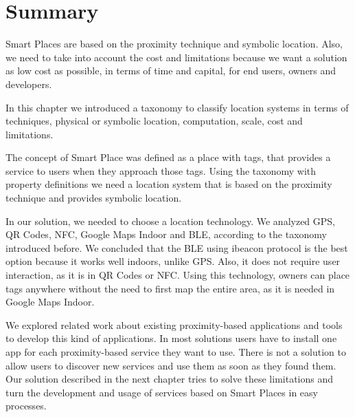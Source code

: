 \section{Summary}
\label{sec:background_summary}

Smart Places are based on the proximity technique and symbolic location.
Also, we need to take into account the cost and limitations because we want a solution as low cost as possible, in terms of time and capital, for end users, owners and developers.

In this chapter we introduced a taxonomy to classify location systems in terms of techniques, physical or symbolic location, computation, scale, cost and limitations.

The concept of Smart Place was defined as a place with tags, that provides a service to users when they approach those tags.
Using the taxonomy with property definitions we need a location system that is based on the proximity technique and provides symbolic location.

In our solution, we needed to choose a location technology.
We analyzed \gls{GPS}, \gls{QR} Codes, \gls{NFC}, Google Maps Indoor and \gls{BLE}, according to the taxonomy introduced before.
We concluded that the \gls{BLE} using ibeacon protocol is the best option because it works well indoors, unlike \gls{GPS}.
Also, it does not require user interaction, as it is in \gls{QR} Codes or \gls{NFC}.
Using this technology, owners can place tags anywhere without the need to first map the entire area, as it is needed in Google Maps Indoor.

We explored related work about existing proximity-based applications and tools to develop this kind of applications.
In most solutions users have to install one app for each proximity-based service they want to use. There is not a solution to allow users to discover new services and use them as soon as they found them.
Our solution described in the next chapter tries to solve these limitations and turn the development and usage of services based on Smart Places in easy processes.
